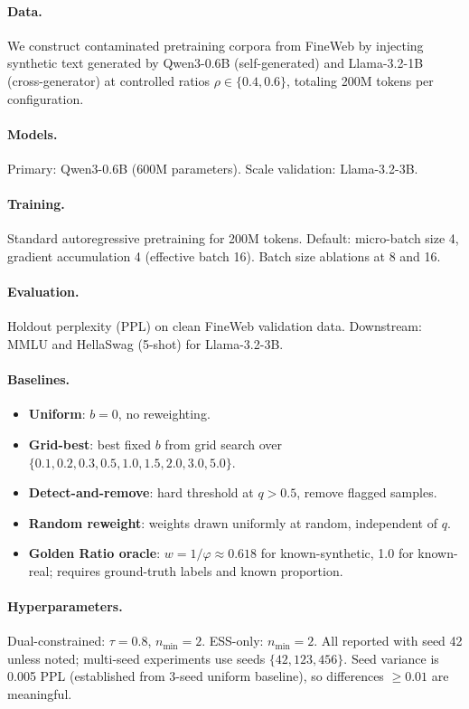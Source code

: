 \documentclass[11pt]{article}
\begin{document}
\paragraph{Data.} We construct contaminated pretraining corpora from FineWeb by injecting synthetic text generated by Qwen3-0.6B (self-generated) and Llama-3.2-1B (cross-generator) at controlled ratios $\rho \in \{0.4, 0.6\}$, totaling 200M tokens per configuration.

\paragraph{Models.} Primary: Qwen3-0.6B (600M parameters). Scale validation: Llama-3.2-3B.

\paragraph{Training.} Standard autoregressive pretraining for 200M tokens. Default: micro-batch size 4, gradient accumulation 4 (effective batch 16). Batch size ablations at 8 and 16.

\paragraph{Evaluation.} Holdout perplexity (PPL) on clean FineWeb validation data. Downstream: MMLU and HellaSwag (5-shot) for Llama-3.2-3B.

\paragraph{Baselines.}
\begin{itemize}
    \item \textbf{Uniform}: $b = 0$, no reweighting.
    \item \textbf{Grid-best}: best fixed $b$ from grid search over $\{0.1, 0.2, 0.3, 0.5, 1.0, 1.5, 2.0, 3.0, 5.0\}$.
    \item \textbf{Detect-and-remove}: hard threshold at $q > 0.5$, remove flagged samples.
    \item \textbf{Random reweight}: weights drawn uniformly at random, independent of $q$.
    \item \textbf{Golden Ratio oracle}: $w = 1/\varphi \approx 0.618$ for known-synthetic, 1.0 for known-real; requires ground-truth labels and known proportion.
\end{itemize}

\paragraph{Hyperparameters.} Dual-constrained: $\tau = 0.8$, $n_{\min} = 2$. ESS-only: $n_{\min} = 2$. All reported with seed 42 unless noted; multi-seed experiments use seeds $\{42, 123, 456\}$. Seed variance is 0.005 PPL (established from 3-seed uniform baseline), so differences $\geq 0.01$ are meaningful.
\end{document}
